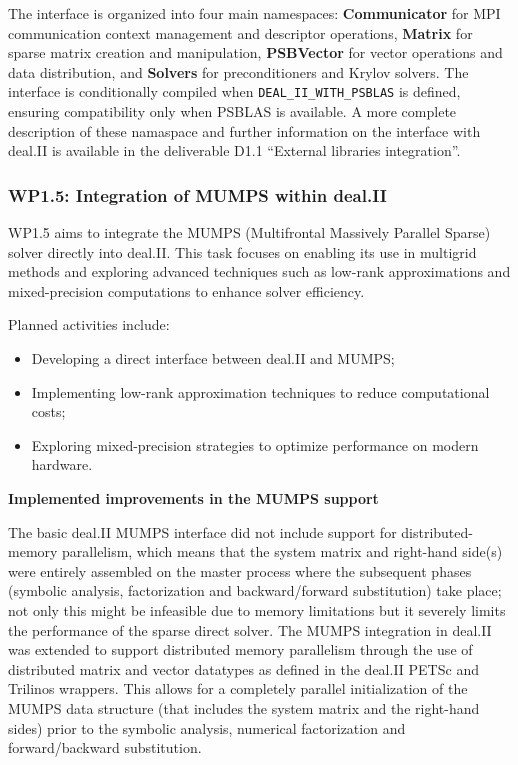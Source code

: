\documentclass[a4paper,12pt, numbers]{article}
\begin{document}
The interface is organized into four main namespaces: \textbf{Communicator} for MPI communication
context management and descriptor operations, \textbf{Matrix} for sparse matrix creation and manipulation,
\textbf{PSBVector} for vector operations and data distribution, and \textbf{Solvers} for preconditioners
and Krylov solvers. The interface is conditionally compiled when \texttt{DEAL\_II\_WITH\_PSBLAS}
is defined, ensuring compatibility only when PSBLAS is available. A more complete description of these namaspace and further information on the interface with deal.II is available in the deliverable D1.1 ``External libraries integration''. 

\subsubsection*{WP1.5: Integration of MUMPS within deal.II} %
WP1.5 aims to integrate the MUMPS (Multifrontal Massively Parallel Sparse) solver directly into deal.II. This task focuses on enabling its use in multigrid methods and exploring advanced techniques such as low-rank approximations and mixed-precision computations to enhance solver efficiency.

Planned activities include:
\begin{itemize}
\item Developing a direct interface between deal.II and MUMPS;
\item Implementing low-rank approximation techniques to reduce computational costs;
\item Exploring mixed-precision strategies to optimize performance on modern hardware.
\end{itemize}

\noindent\textbf{Implemented improvements in the MUMPS support}

The basic deal.II MUMPS interface did not include support for
distributed-memory parallelism, which means that the system matrix and
right-hand side(s) were entirely assembled on the master process where
the subsequent phases (symbolic analysis, factorization and
backward/forward substitution) take place; not only this might be
infeasible due to memory limitations but it severely limits the
performance of the sparse direct solver. The MUMPS integration in
deal.II was extended to support distributed memory parallelism through
the use of distributed matrix and vector datatypes as defined in the
deal.II PETSc and Trilinos wrappers. This allows for a completely
parallel initialization of the MUMPS data structure (that includes the
system matrix and the right-hand sides) prior to the symbolic
analysis, numerical factorization and forward/backward substitution.
\end{document}
